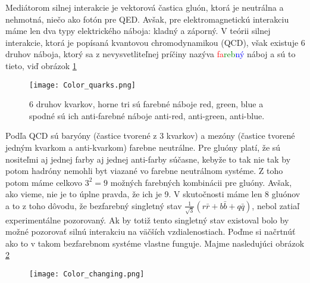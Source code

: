 \documentclass[../../main.tex]{subfiles}
\begin{document}
Mediátorom silnej interakcie je vektorová častica gluón, ktorá je neutrálna a nehmotná, niečo ako fotón pre QED. Avšak, pre elektromagnetickú interakciu máme len dva typy elektrického náboja: kladný a záporný. V teórii silnej interakcie, ktorá je popísaná kvantovou chromodynamikou (QCD), však existuje 6 druhov náboja, ktorý sa z nevysvetliteľnej príčiny nazýva \textcolor{red}{fa}\textcolor{green}{reb}\textcolor{blue}{ný} náboj a sú to tieto, viď obrázok \ref{sf1:fig:Color_quarks}
\begin{figure}[!h]
\centering
\texttt{[image: Color\_quarks.png]}
\caption{6 druhov kvarkov, horne tri sú farebné náboje red, green, blue a spodné sú ich anti-farebné náboje anti-red, anti-green, anti-blue.}
\label{sf1:fig:Color_quarks}
\end{figure}
\newline
Podľa QCD sú baryóny (častice tvorené z 3 kvarkov) a mezóny (častice tvorené jedným kvarkom a anti-kvarkom) farebne neutrálne. Pre gluóny platí, že sú nositeľmi aj jednej farby aj jednej anti-farby súčasne, kebyže to tak nie tak by potom hadróny nemohli byt viazané vo farebne neutrálnom systéme.  Z toho potom máme celkovo $3^2=9$ možných farebných kombinácii pre gluóny. Avšak, ako vieme, nie je to úplne pravda, že ich je 9. V skutočnosti máme len 8 gluónov a to z toho dôvodu, že bezfarebný singletný stav $\frac{1}{\sqrt{3}}(r\bar{r}+b\bar{b}+q\bar{q})$, nebol zatiaľ experimentálne pozorovaný. Ak by totiž tento singletný stav existoval bolo by možné pozorovať silnú interakciu na väčších vzdialenostiach. Poďme si načrtnúť ako to v takom bezfarebnom systéme vlastne funguje. Majme nasledujúci obrázok \ref{sf1:fig:Prechody}
\begin{figure}[!h]
\centering
\texttt{[image: Color\_changing.png]}
\caption{}
\label{sf1:fig:Prechody}
\end{figure}
\newline
\end{document}
